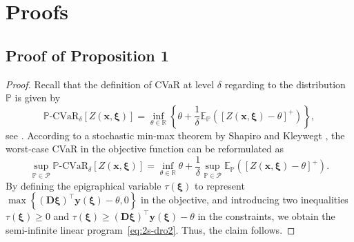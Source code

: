 \documentclass{article}
\newcommand{\PP}{\mathbb{P}}
\newcommand{\EE}{\mathbb{E}}
\newcommand{\RR}{\mathbb{R}}
\begin{document}
% 
% 



\newpage

\appendix

\section{Proofs}
\subsection{Proof of Proposition 1}
\begin{proof}
Recall that the definition of CVaR at level $\delta$ regarding to the distribution $\PP$ is given by
$$\PP\text{-CVaR}_\delta [Z(\bm x, \bm \xi)] = \inf_{\theta \in \RR} \left \{ \theta + \frac{1}{\delta} \EE_{\PP} \left ( [Z(\bm x, \bm \xi) - \theta] ^{+}  \right ) \right \},$$
see \cite{CVaR-def}. According to a stochastic min-max theorem by Shapiro and Kleywegt \cite{minimax-thm}, the worst-case CVaR in the objective function can be reformulated as
$$\sup_{\PP\in \mathcal P} \PP\text{-CVaR}_\delta [Z(\bm x, \bm \xi)] = \inf_{\theta \in \RR}  \theta + \frac{1}{\delta} \sup_{\PP\in \mathcal P} \EE_{\PP} \left ( [Z(\bm x, \bm \xi) - \theta] ^{+} \right ).$$
By defining the epigraphical variable $\tau(\bm \xi)$ to represent $\max\left \{ (\bm D \bm \xi)^\top \bm y (\bm \xi) - \theta, 0 \right \}$ in the objective, %
and introducing two  inequalities $\tau(\bm \xi) \geq 0$ and $ \tau(\bm \xi) \geq (\bm D \bm \xi)^\top \bm y (\bm \xi) - \theta$ in the constraints, we obtain the semi-infinite linear program~\eqref{eq:2s-dro2}.
Thus, the claim follows. \end{proof}
\end{document}
